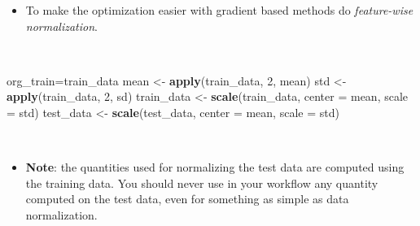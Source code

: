 \documentclass[
  10pt,
  ignorenonframetext,
  twocolumn]{beamer}
\newenvironment{Shaded}{\begin{snugshade}}{\end{snugshade}}
\newcommand{\AttributeTok}[1]{\textcolor[rgb]{0.13,0.29,0.53}{#1}}
\newcommand{\DecValTok}[1]{\textcolor[rgb]{0.00,0.00,0.81}{#1}}
\newcommand{\FunctionTok}[1]{\textcolor[rgb]{0.13,0.29,0.53}{\textbf{#1}}}
\newcommand{\NormalTok}[1]{#1}
\newcommand{\OtherTok}[1]{\textcolor[rgb]{0.56,0.35,0.01}{#1}}
\providecommand{\tightlist}{%
  \setlength{\itemsep}{0pt}\setlength{\parskip}{0pt}}
\begin{document}
\begin{frame}[fragile]
\begin{itemize}
\tightlist
\item
  To make the optimization easier with gradient based methods do
  \emph{feature-wise normalization}.
\end{itemize}

\(~\)

\scriptsize

\begin{Shaded}
\begin{Highlighting}[]
\NormalTok{org\_train}\OtherTok{=}\NormalTok{train\_data}
\NormalTok{mean }\OtherTok{\textless{}{-}} \FunctionTok{apply}\NormalTok{(train\_data, }\DecValTok{2}\NormalTok{, mean)}
\NormalTok{std }\OtherTok{\textless{}{-}} \FunctionTok{apply}\NormalTok{(train\_data, }\DecValTok{2}\NormalTok{, sd)}
\NormalTok{train\_data }\OtherTok{\textless{}{-}} \FunctionTok{scale}\NormalTok{(train\_data, }\AttributeTok{center =}\NormalTok{ mean, }\AttributeTok{scale =}\NormalTok{ std)}
\NormalTok{test\_data }\OtherTok{\textless{}{-}} \FunctionTok{scale}\NormalTok{(test\_data, }\AttributeTok{center =}\NormalTok{ mean, }\AttributeTok{scale =}\NormalTok{ std)}
\end{Highlighting}
\end{Shaded}

\(~\)

\normalsize

\begin{itemize}
\tightlist
\item
  \textbf{Note}: the quantities used for normalizing the test data are
  computed using the training data. You should never use in your
  workflow any quantity computed on the test data, even for something as
  simple as data normalization.
\end{itemize}
\end{frame}
\end{document}

